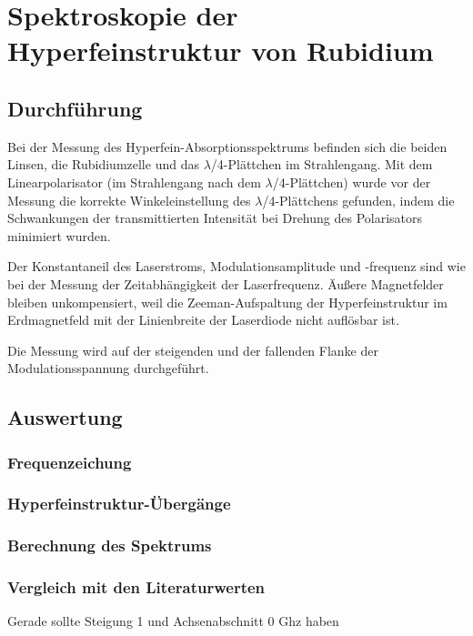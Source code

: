 \section{Spektroskopie der Hyperfeinstruktur von Rubidium}
\subsection{Durchführung}
Bei der Messung des Hyperfein-Absorptionsspektrums befinden sich die beiden Linsen, die Rubidiumzelle und
das $\lambda$/4-Plättchen im Strahlengang.
Mit dem Linearpolarisator (im Strahlengang nach dem $\lambda$/4-Plättchen) wurde vor der Messung die
korrekte Win\-kel\-ein\-stel\-lung des $\lambda$/4-Plättchens gefunden,
indem die Schwankungen der transmittierten Intensität
bei Drehung des Polarisators minimiert wurden.

Der Konstantaneil des Laserstroms, Modulationsamplitude und -frequenz
sind wie bei der Messung der Zeitabhängigkeit der Laserfrequenz.
Äußere Magnetfelder bleiben unkompensiert, weil die Zeeman-Aufspaltung der Hyperfeinstruktur im Erdmagnetfeld
mit der Linienbreite der Laserdiode nicht auflösbar ist.

Die Messung wird auf der steigenden und der fallenden Flanke der Modulationsspannung durchgeführt.


\subsection{Auswertung}
\subsubsection*{Frequenzeichung}
\subsubsection*{Hyperfeinstruktur-Übergänge}
\subsubsection*{Berechnung des Spektrums}
\subsubsection*{Vergleich mit den Literaturwerten}
Gerade sollte Steigung 1 und Achsenabschnitt 0 Ghz haben
